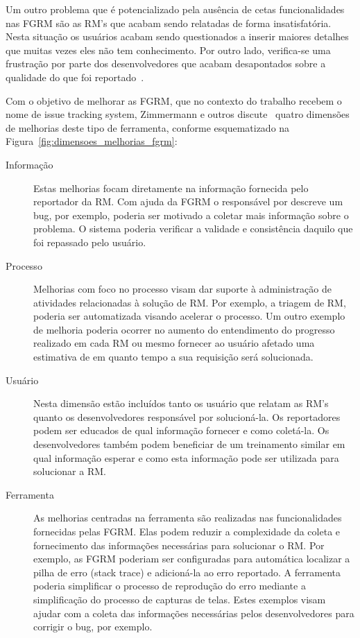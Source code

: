 Um outro problema que é potencializado pela ausência de cetas funcionalidades
nas FGRM são as RM's que acabam sendo relatadas de forma insatisfatória. Nesta
situação os usuários acabam sendo questionados a inserir maiores detalhes que
muitas vezes eles não tem conhecimento. Por outro lado, verifica-se uma
frustração por parte dos desenvolvedores que acabam desapontados sobre a
qualidade do que foi reportado~\cite{just2008towards}.

Com o objetivo de melhorar as FGRM, que no contexto do trabalho recebem o nome
de issue tracking system, Zimmermann e outros
discute~\cite{zimmermann2009improving} quatro dimensões de melhorias deste tipo
de ferramenta, conforme esquematizado na
Figura~\ref{fig:dimensoes_melhorias_fgrm}:

\begin{description}
	\item[Informação] Estas melhorias focam diretamente na informação fornecida
		pelo reportador da RM\@. Com ajuda da FGRM o responsável por descreve um
		bug, por exemplo, poderia ser motivado a coletar mais informação sobre o
		problema. O sistema poderia verificar a validade e consistência daquilo
		que foi repassado pelo usuário.
   \item[Processo] Melhorias com foco no processo visam dar suporte à
	   administração de atividades relacionadas à solução de RM\@. Por exemplo, a
	   triagem de RM, poderia ser automatizada visando acelerar o processo. Um
	   outro exemplo de melhoria poderia ocorrer no aumento do entendimento do
	   progresso realizado em cada RM ou mesmo fornecer ao usuário afetado uma
	   estimativa de em quanto tempo a sua requisição será solucionada. 
	\item[Usuário] Nesta dimensão estão incluídos tanto os usuário que relatam
		as RM's quanto os desenvolvedores responsável por solucioná-la. Os
		reportadores podem ser educados de qual informação fornecer e como
		coletá-la. Os desenvolvedores também podem beneficiar de um treinamento
		similar em qual informação esperar e como esta informação pode ser
		utilizada para solucionar a RM\@.
	\item[Ferramenta] As melhorias centradas na ferramenta são realizadas nas
		funcionalidades fornecidas pelas FGRM\@. Elas podem reduzir a complexidade
		da coleta e fornecimento das informações necessárias para solucionar o
		RM\@. Por exemplo, as FGRM poderiam ser configuradas para automática
		localizar a pilha de erro (stack trace) e adicioná-la ao erro reportado.
		A ferramenta poderia simplificar o processo de reprodução do erro
		mediante a simplificação do processo de capturas de telas. Estes
		exemplos visam ajudar com a coleta das informações necessárias pelos
		desenvolvedores para corrigir o bug, por exemplo.
\end{description}

